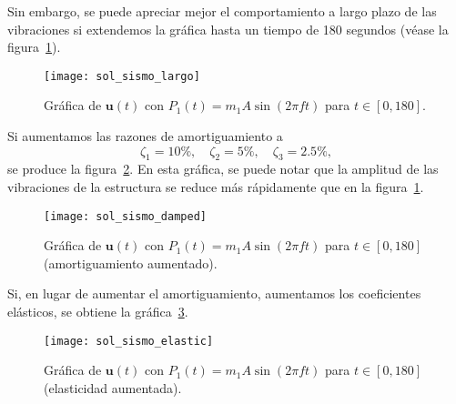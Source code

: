 Sin embargo, se puede apreciar mejor el comportamiento a largo plazo de las vibraciones si extendemos la gráfica hasta un tiempo de 180 segundos (véase la figura~\ref{fig:sol-sismo-largo}).

\begin{figure}[ht!]
    \centering
    \texttt{[image: sol\_sismo\_largo]}
    \caption{Gráfica de \(\mathbf{u}(t)\) con \(P_1(t) = m_1 A \sin(2\pi f t)\) para \(t \in [0, 180]\).}
    \label{fig:sol-sismo-largo}
\end{figure}

Si aumentamos las razones de amortiguamiento a
\[
    \zeta_1 = 10\%, \quad \zeta_2 = 5\%, \quad \zeta_3 = 2.5\%
,\]
se produce la figura~\ref{fig:sol-sismo-damped}. En esta gráfica, se puede notar que la amplitud de las vibraciones de la estructura se reduce más rápidamente que en la figura~\ref{fig:sol-sismo-largo}.

\begin{figure}[ht!]
    \centering
    \texttt{[image: sol\_sismo\_damped]}
    \caption{Gráfica de \(\mathbf{u}(t)\) con \(P_1(t) = m_1 A \sin(2\pi f t)\) para \(t \in [0, 180]\) (amortiguamiento aumentado).}
    \label{fig:sol-sismo-damped}
\end{figure}

Si, en lugar de aumentar el amortiguamiento, aumentamos los coeficientes elásticos, se obtiene la gráfica~\ref{fig:sol-sismo-elastic}.

\begin{figure}[ht!]
    \centering
    \texttt{[image: sol\_sismo\_elastic]}
    \caption{Gráfica de \(\mathbf{u}(t)\) con \(P_1(t) = m_1 A \sin(2\pi f t)\) para \(t \in [0, 180]\) (elasticidad aumentada).}
    \label{fig:sol-sismo-elastic}
\end{figure}
